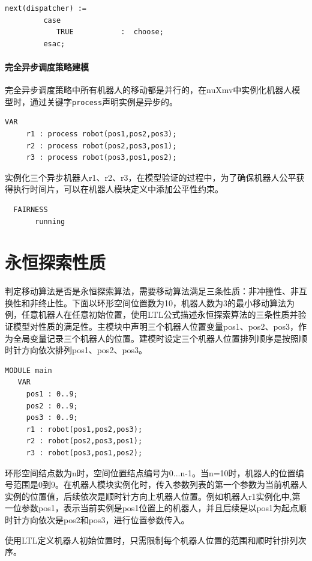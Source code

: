 \begin{lstlisting}
next(dispatcher) :=
         case
            TRUE           :  choose;
         esac;
\end{lstlisting}

\paragraph{完全异步调度策略建模}
完全异步调度策略中所有机器人的移动都是并行的，在nuXmv中实例化机器人模型时，通过关键字\verb|process|声明实例是异步的。

\begin{lstlisting}
VAR
     r1 : process robot(pos1,pos2,pos3);
     r2 : process robot(pos2,pos3,pos1);
     r3 : process robot(pos3,pos1,pos2);
\end{lstlisting}

实例化三个异步机器人r1、r2、r3，在模型验证的过程中，为了确保机器人公平获得执行时间片，可以在机器人模块定义中添加公平性约束。

\begin{lstlisting}
  FAIRNESS
       running
\end{lstlisting}


\section{永恒探索性质}
判定移动算法是否是永恒探索算法，需要移动算法满足三条性质：非冲撞性、非互换性和非终止性。下面以环形空间位置数为10，机器人数为3的最小移动算法为例，任意机器人在任意初始位置，使用LTL公式描述永恒探索算法的三条性质并验证模型对性质的满足性。主模块中声明三个机器人位置变量pos1、pos2、pos3，作为全局变量记录三个机器人的位置。建模时设定三个机器人位置排列顺序是按照顺时针方向依次排列pos1、pos2、pos3。

\begin{lstlisting}
MODULE main
   VAR
     pos1 : 0..9;
     pos2 : 0..9;
     pos3 : 0..9;
     r1 : robot(pos1,pos2,pos3);
     r2 : robot(pos2,pos3,pos1);
     r3 : robot(pos3,pos1,pos2);
\end{lstlisting}

环形空间结点数为n时，空间位置结点编号为0...n-1。当n=10时，机器人的位置编号范围是0到9。在机器人模块实例化时，传入参数列表的第一个参数为当前机器人实例的位置值，后续依次是顺时针方向上机器人位置。例如机器人r1实例化中,第一位参数pos1，表示当前实例是pos1位置上的机器人，并且后续是以pos1为起点顺时针方向依次是pos2和pos3，进行位置参数传入。

使用LTL定义机器人初始位置时，只需限制每个机器人位置的范围和顺时针排列次序。

